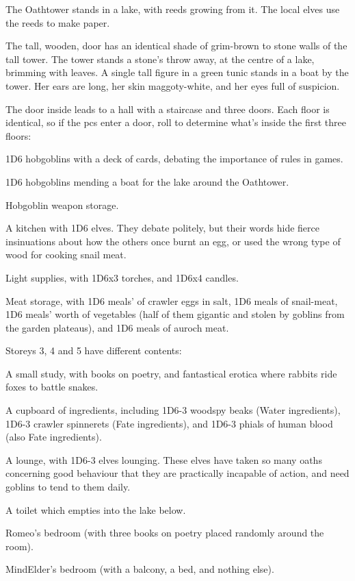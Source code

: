\begin{multicols}{2}

The Oathtower stands in a lake, with reeds growing from it.
The local elves use the reeds to make paper.

\begin{boxtext}
  The tall, wooden, door has an identical shade of grim-brown to stone walls of the tall tower.
  The tower stands a stone's throw away, at the centre of a lake, brimming with leaves.
  A single tall figure in a green tunic stands in a boat by the tower.
  Her ears are long, her skin maggoty-white, and her eyes full of suspicion.
\end{boxtext}

The door inside leads to a hall with a staircase and three doors.
Each floor is identical, so if the \glspl{pc} enter a door, roll to determine what's inside the first three floors:

\begin{dlist}
  \item
  1D6 hobgoblins with a deck of cards, debating the importance of rules in games.
  \item
  1D6 hobgoblins mending a boat for the lake around the Oathtower.
  \item
  Hobgoblin weapon storage.
  \item
  A kitchen with 1D6 elves.  They debate politely, but their words hide fierce insinuations about how the others once burnt an egg, or used the wrong type of wood for cooking snail meat.
  \item
  Light supplies, with 1D6x3 torches, and 1D6x4 candles.
  \item
  Meat storage, with 1D6 meals' of \gls{crawler} eggs in salt, 1D6 meals of snail-meat, 1D6 meals' worth of vegetables (half of them gigantic and stolen by goblins from the garden plateaus), and 1D6 meals of auroch meat.
\end{dlist}

Storeys 3, 4 and 5 have different contents:

\begin{dlist}
  \item
  A small study, with books on poetry, and fantastical erotica where rabbits ride foxes to battle snakes.
  \item
  A cupboard of \glspl{ingredient}, including 1D6-3 woodspy beaks (Water \glspl{ingredient}), 1D6-3 \gls{crawler} spinnerets (Fate \glspl{ingredient}), and 1D6-3 phials of human blood (also Fate \glspl{ingredient}).
  \item
  A lounge, with 1D6-3 elves lounging.  These elves have taken so many oaths concerning good behaviour that they are practically incapable of action, and need goblins to tend to them daily.
  \item
  A toilet which empties into the lake below.
  \item
  Romeo's bedroom (with three books on poetry placed randomly around the room).
  \item
  \gls{MindElder}'s bedroom (with a balcony, a bed, and nothing else).
\end{dlist}

\end{multicols}

